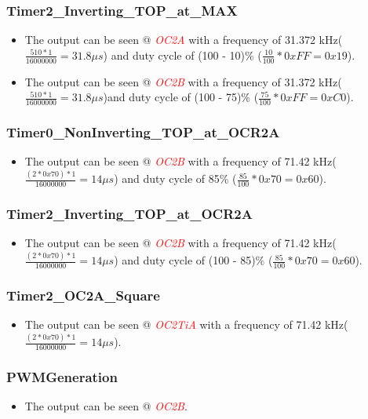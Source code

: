 \documentclass[oneside]{book}
\newcommand{\pinFormat}[1]{\emph{\textcolor{red}{#1}}}
\begin{document}
\subsubsection{Timer2\_Inverting\_TOP\_at\_MAX}
\begin{itemize}
    \item The output can be seen @ \pinFormat{OC2A} with a frequency of 31.372 kHz($\frac{510 * 1}{16000000} = 31.8\mu s$) and duty cycle of (100 - 10)\% ($\frac{10}{100} * 0xFF = 0x19$).
    \item The output can be seen @ \pinFormat{OC2B} with a frequency of 31.372 kHz($\frac{510 * 1}{16000000} = 31.8\mu s$)and duty cycle of (100 - 75)\% ($\frac{75}{100} * 0xFF = 0xC0$).
\end{itemize}
\subsubsection{Timer0\_NonInverting\_TOP\_at\_OCR2A}
\begin{itemize}
    \item The output can be seen @ \pinFormat{OC2B} with a frequency of 71.42 kHz($\frac{(2*0x70) * 1}{16000000} = 14\mu s$) and duty cycle of 85\% ($\frac{85}{100} * 0x70 = 0x60$).
\end{itemize}
\subsubsection{Timer2\_Inverting\_TOP\_at\_OCR2A}
\begin{itemize}
    \item The output can be seen @ \pinFormat{OC2B} with a frequency of 71.42 kHz($\frac{(2*0x70) * 1}{16000000} = 14\mu s$) and duty cycle of (100 - 85)\% ($\frac{85}{100} * 0x70 = 0x60$).
\end{itemize}
\subsubsection{Timer2\_OC2A\_Square}
\begin{itemize}
    \item The output can be seen @ \pinFormat{OC2TiA} with a frequency of 71.42 kHz($\frac{(2*0x70) * 1}{16000000} = 14\mu s$).
\end{itemize}
\subsubsection{PWMGeneration}
\begin{itemize}
    \item The output can be seen @ \pinFormat{OC2B}.
\end{itemize}
\end{document}
